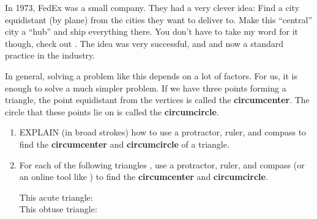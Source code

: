\documentclass[nooutcomes,noauthor,hints,handout]{ximera}
\begin{document}
\begin{question}
  In 1973, FedEx was a small company. They had a very clever idea:
  Find a city equidistant (by plane) from the cities they want to
  deliver to.  Make this ``central'' city a ``hub'' and ship
  everything there.  You don't have to take my word for it though,
  check out .
  The idea was very successful, and and now a standard practice in the
  industry.

  In general, solving a problem like this depends on a lot of
  factors. For us, it is enough to solve a much simpler problem. If we
  have three points forming a triangle, the point equidistant from the
  vertices is called the \textbf{circumcenter}. The circle that these
  points lie on is called the \textbf{circumcircle}.
  \begin{enumerate}
  \item EXPLAIN (in broad strokes) how to use a protractor, ruler, and
    compass to find the \textbf{circumcenter} and
    \textbf{circumcircle} of a triangle.
  \item For each of the following triangles , use a protractor, ruler,
    and compass (or an online tool like
    ) to
    find the \textbf{circumcenter} and \textbf{circumcircle}.
    \begin{description}
    \item[This acute triangle:] \begin{center}
      \end{center}
        \item[This obtuse triangle:]
          \begin{center}
\end{center}
\end{description}
\end{enumerate}
\end{question}
\end{document}
